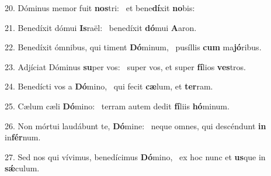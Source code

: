 20. Dóminus memor fuit \textbf{nos}tri: \ast\  et bene\textbf{dí}xit \textbf{no}bis:\

21. Benedíxit dómui \textbf{Is}raël: \ast\  benedíxit \textbf{dó}mui \textbf{A}aron.\

22. Benedíxit ómnibus, qui timent \textbf{Dó}minum, \ast\  pusíllis \textbf{cum} ma\textbf{jó}ribus.\

23. Adjíciat Dóminus \textbf{su}per vos: \ast\  super vos, et super \textbf{fí}lios \textbf{ves}tros.\

24. Benedícti vos a \textbf{Dó}mino, \ast\  qui fecit \textbf{cæ}lum, et \textbf{ter}ram.\

25. Cælum cæli \textbf{Dó}mino: \ast\  terram autem dedit \textbf{fí}liis \textbf{hó}minum.\

26. Non mórtui laudábunt te, \textbf{Dó}mine: \ast\  neque omnes, qui descéndunt \textbf{in} in\textbf{fér}num.\

27. Sed nos qui vívimus, benedícimus \textbf{Dó}mino, \ast\  ex hoc nunc et \textbf{us}que in \textbf{sǽ}culum.\

